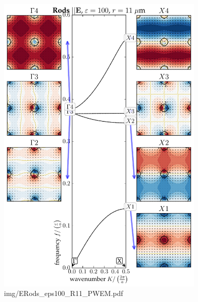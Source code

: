 \begin{figure} \caption{img/ERods\_eps100\_R11\_PWEM.pdf}  \centering \includegraphics[width=10cm]{img/ERods_eps100_R11_PWEM.pdf} \end{figure} \clearpage

